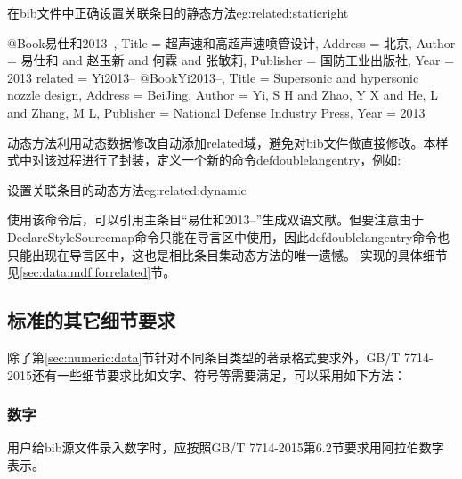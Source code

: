 \begin{example}{在bib文件中正确设置关联条目的静态方法}{eg:related:staticright}
\begin{texlist}
@Book{易仕和2013--,
  Title                    = {超声速和高超声速喷管设计},
  Address                  = {北京},
  Author                   = {易仕和 and 赵玉新 and 何霖 and 张敏莉},
  Publisher                = {国防工业出版社},
  Year                     = {2013}
  related                  = {Yi2013--}
}
@Book{Yi2013--,
  Title                    = {Supersonic and hypersonic nozzle design},
  Address                  = {BeiJing},
  Author                   = {Yi, S H and Zhao, Y X and He, L and Zhang, M L},
  Publisher                = {National Defense Industry Press},
  Year                     = {2013}
}
\end{texlist}
\end{example}

动态方法利用动态数据修改自动添加related域，避免对bib文件做直接修改。本样式中对该过程进行了封装，定义一个新的命令defdoublelangentry，例如:
\begin{example}{设置关联条目的动态方法}{eg:related:dynamic}
\begin{texlist}
\end{texlist}
\end{example}

使用该命令后，可以引用主条目“易仕和2013--”生成双语文献。但要注意由于DeclareStyleSourcemap命令只能在导言区中使用，因此defdoublelangentry命令也只能出现在导言区中，这也是相比条目集动态方法的唯一遗憾。
实现的具体细节见\ref{sec:data:mdf:forrelated}节。

\subsection{标准的其它细节要求}

除了第\ref{sec:numeric:data}节针对不同条目类型的著录格式要求外，GB/T 7714-2015还有一些细节要求比如文字、符号等需要满足，可以采用如下方法：

\subsubsection{数字}\label{sec:fmt:number}

\begin{property}{}{}
用户给bib源文件录入数字时，应按照GB/T 7714-2015第6.2节要求用阿拉伯数字表示。
\end{property}

